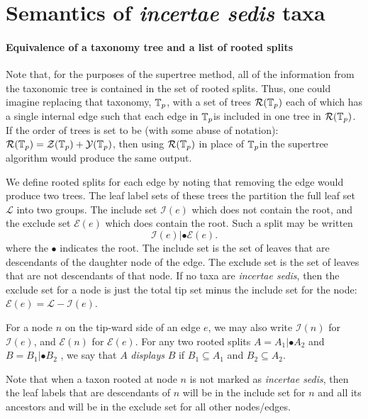 \documentclass[english]{article}
\begin{document}
\section{\label{sec:Semantics-of-incertae}Semantics of \emph{incertae
sedis} taxa}

\paragraph{Equivalence of a taxonomy tree and a list of rooted splits}

Note that, for the purposes of the supertree method, all of the
information from the taxonomic tree is contained in the set of rooted
splits. Thus, one could imagine replacing that taxonomy,
$\mbox{\ensuremath{\mathbb{T}}}_{p}$, with a set of trees $\mathcal{R}(\mbox{\ensuremath{\mathbb{T}}}_{p})$ each
of which has a single internal edge such that each edge in
$\mbox{\ensuremath{\mathbb{T}}}_{p}$is included in one tree in
$\mathcal{R}(\mbox{\ensuremath{\mathbb{T}}}_{p})$. If the order of trees is set to be (with
some abuse of notation):
$\mathcal{R}(\mbox{\ensuremath{\mathbb{T}}}_{p})=\mathcal{Z}(\mbox{\ensuremath{\mathbb{T}}}_{p}) + 
\mathcal{Y}(\mbox{\ensuremath{\mathbb{T}}}_{p})$, then using $\mathcal{R}(\mbox{\ensuremath{\mathbb{T}}}_{p})$ in
place of $\mbox{\ensuremath{\mathbb{T}}}_{p}$in the supertree algorithm would produce the
same output.

We define rooted splits for each edge by noting that removing the edge
would produce two trees. The leaf label sets of these trees the
partition the full leaf set $\mathcal{L}$ into two groups. The include
set $\mathcal{I}(e)$ which does not contain the root, and the exclude
set $\mathcal{E}(e)$ which does contain the root. Such a split may be
written \[ \mathcal{I}(e)|\bullet\mathcal{E}(e). \] where the
$\bullet$ indicates the root. The include set is the set of leaves
that are descendants of the daughter node of the edge. The exclude set
is the set of leaves that are not descendants of that node. If no taxa
are \emph{incertae sedis}, then the exclude set for a node is just the
total tip set minus the include set for the node:
$\mathcal{E}(e)  =\mathcal{L}-\mathcal{I}(e)$. 

For a node $n$ on the tip-ward side of an edge $e$, we may also write
$\mathcal{I}(n)$ for $\mathcal{I}(e)$, and $\mathcal{E}(n)$ for
$\mathcal{E}(e)$. For any two rooted splits $A=A_{1}|\bullet A_{2}$
and $B=B_{1}|\bullet B_{2}$ , we say that $A$ \emph{displays }$B$ if
$B_{1}\subseteq A_{1}$ and $B_{2}\subseteq A_{2}$.

Note that when a taxon rooted at node $n$ is not marked as
\emph{incertae sedis}, then the leaf labels that are descendants of
$n$ will be in the include set for $n$ and all its ancestors and will
be in the exclude set for all other nodes/edges.
\end{document}
